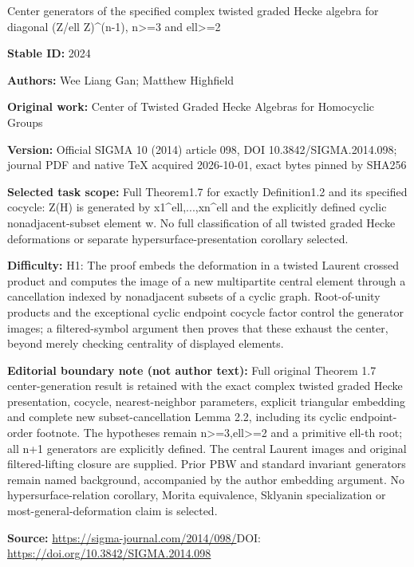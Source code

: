 \documentclass[11pt]{article}
\numberwithin{equation}{section}
\begin{document}
\begin{center}\Large Center generators of the specified complex twisted graded Hecke algebra for diagonal (Z/ell Z)\textasciicircum{}(n-1), n>=\allowbreak{}3 and ell>=\allowbreak{}2\end{center}
\noindent\textbf{Stable ID:} 2024\par
\noindent\textbf{Authors:} Wee Liang Gan; Matthew Highfield\par
\noindent\textbf{Original work:} Center of Twisted Graded Hecke Algebras for Homocyclic Groups\par
\noindent\textbf{Version:} Official SIGMA 10 (2014) article 098, DOI 10.3842/SIGMA.2014.098; journal PDF and native TeX acquired 2026-10-01, exact bytes pinned by SHA256\par
\noindent\textbf{Selected task scope:} Full Theorem1.7 for exactly Definition1.2 and its specified cocycle: Z(H) is generated by x1\textasciicircum{}ell,...,xn\textasciicircum{}ell and the explicitly defined cyclic nonadjacent-subset element w. No full classification of all twisted graded Hecke deformations or separate hypersurface-presentation corollary selected.\par
\noindent\textbf{Difficulty:} H1: The proof embeds the deformation in a twisted Laurent crossed product and computes the image of a new multipartite central element through a cancellation indexed by nonadjacent subsets of a cyclic graph. Root-of-unity products and the exceptional cyclic endpoint cocycle factor control the generator images; a filtered-symbol argument then proves that these exhaust the center, beyond merely checking centrality of displayed elements.\par
\noindent\textbf{Editorial boundary note (not author text):} Full original Theorem 1.7 center-generation result is retained with the exact complex twisted graded Hecke presentation, cocycle, nearest-neighbor parameters, explicit triangular embedding and complete new subset-cancellation Lemma 2.2, including its cyclic endpoint-order footnote. The hypotheses remain n>=\allowbreak{}3,ell>=\allowbreak{}2 and a primitive ell-th root; all n+\allowbreak{}1 generators are explicitly defined. The central Laurent images and original filtered-lifting closure are supplied. Prior PBW and standard invariant generators remain named background, accompanied by the author embedding argument. No hypersurface-relation corollary, Morita equivalence, Sklyanin specialization or most-general-deformation claim is selected.\par
\noindent\textbf{Source:} \url{https://sigma-journal.com/2014/098/}\quad DOI: \url{https://doi.org/10.3842/SIGMA.2014.098}\par
\end{document}

